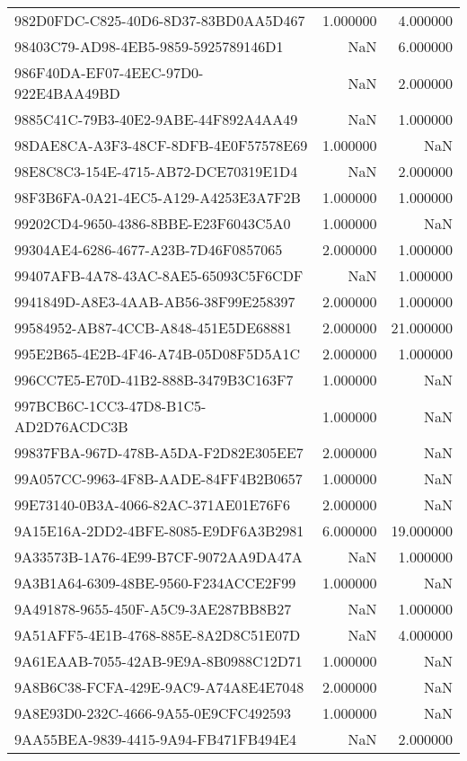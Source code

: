 \begin{tabular}{lrr}
982D0FDC-C825-40D6-8D37-83BD0AA5D467 & 1.000000 & 4.000000 \\
98403C79-AD98-4EB5-9859-5925789146D1 & NaN & 6.000000 \\
986F40DA-EF07-4EEC-97D0-922E4BAA49BD & NaN & 2.000000 \\
9885C41C-79B3-40E2-9ABE-44F892A4AA49 & NaN & 1.000000 \\
98DAE8CA-A3F3-48CF-8DFB-4E0F57578E69 & 1.000000 & NaN \\
98E8C8C3-154E-4715-AB72-DCE70319E1D4 & NaN & 2.000000 \\
98F3B6FA-0A21-4EC5-A129-A4253E3A7F2B & 1.000000 & 1.000000 \\
99202CD4-9650-4386-8BBE-E23F6043C5A0 & 1.000000 & NaN \\
99304AE4-6286-4677-A23B-7D46F0857065 & 2.000000 & 1.000000 \\
99407AFB-4A78-43AC-8AE5-65093C5F6CDF & NaN & 1.000000 \\
9941849D-A8E3-4AAB-AB56-38F99E258397 & 2.000000 & 1.000000 \\
99584952-AB87-4CCB-A848-451E5DE68881 & 2.000000 & 21.000000 \\
995E2B65-4E2B-4F46-A74B-05D08F5D5A1C & 2.000000 & 1.000000 \\
996CC7E5-E70D-41B2-888B-3479B3C163F7 & 1.000000 & NaN \\
997BCB6C-1CC3-47D8-B1C5-AD2D76ACDC3B & 1.000000 & NaN \\
99837FBA-967D-478B-A5DA-F2D82E305EE7 & 2.000000 & NaN \\
99A057CC-9963-4F8B-AADE-84FF4B2B0657 & 1.000000 & NaN \\
99E73140-0B3A-4066-82AC-371AE01E76F6 & 2.000000 & NaN \\
9A15E16A-2DD2-4BFE-8085-E9DF6A3B2981 & 6.000000 & 19.000000 \\
9A33573B-1A76-4E99-B7CF-9072AA9DA47A & NaN & 1.000000 \\
9A3B1A64-6309-48BE-9560-F234ACCE2F99 & 1.000000 & NaN \\
9A491878-9655-450F-A5C9-3AE287BB8B27 & NaN & 1.000000 \\
9A51AFF5-4E1B-4768-885E-8A2D8C51E07D & NaN & 4.000000 \\
9A61EAAB-7055-42AB-9E9A-8B0988C12D71 & 1.000000 & NaN \\
9A8B6C38-FCFA-429E-9AC9-A74A8E4E7048 & 2.000000 & NaN \\
9A8E93D0-232C-4666-9A55-0E9CFC492593 & 1.000000 & NaN \\
9AA55BEA-9839-4415-9A94-FB471FB494E4 & NaN & 2.000000 \\

\end{tabular}
